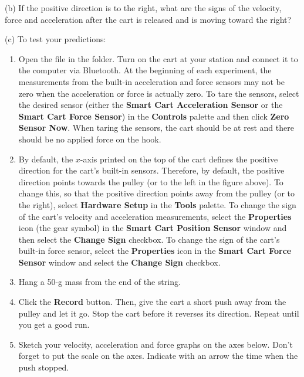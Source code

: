 (b) If the positive direction is to the right, what are the signs of the velocity, force and acceleration after the cart is released and is moving toward
the right?
\vspace{10mm}

(c) To test your predictions: 

\begin{enumerate}
\item Open the file  in the \filename{\coursefolder} folder. Turn on the cart at your station and connect it to the computer via Bluetooth. At the beginning of each experiment, the measurements from the built-in acceleration and force sensors may not be zero when the acceleration or force is actually zero. To tare the sensors, select the desired sensor (either the \textbf{Smart Cart Acceleration Sensor} or the \textbf{Smart Cart Force Sensor}) in the \textbf{Controls} palette and then click \textbf{Zero Sensor Now}. When taring the sensors, the cart should be at rest and there should be no applied force on the hook.

\item By default, the $x$-axis printed on the top of the cart defines the positive direction for the cart's built-in sensors. Therefore, by default, the positive direction points towards the pulley (or to the left in the figure above). To change this, so that the positive direction points away from the pulley (or to the right), select \textbf{Hardware Setup} in the \textbf{Tools} palette. To change the sign of the cart's velocity and acceleration measurements, select the \textbf{Properties} icon (the gear symbol) in the \textbf{Smart Cart Position Sensor} window and then select the \textbf{Change Sign} checkbox. To change the sign of the cart's built-in force sensor, select the \textbf{Properties} icon in the \textbf{Smart Cart Force Sensor} window and select the \textbf{Change Sign} checkbox. 

\item Hang a 50-g mass from the end of the string.
 
\item Click the \textbf{Record} button. Then, give the cart a short push away from the pulley and let it go. Stop the cart before it reverses its direction. Repeat until you get a good run. 

\item Sketch your velocity, acceleration and force graphs on the axes below. Don't forget to put the scale on the axes.
Indicate with an arrow the time when the push
stopped.
\end{enumerate}
